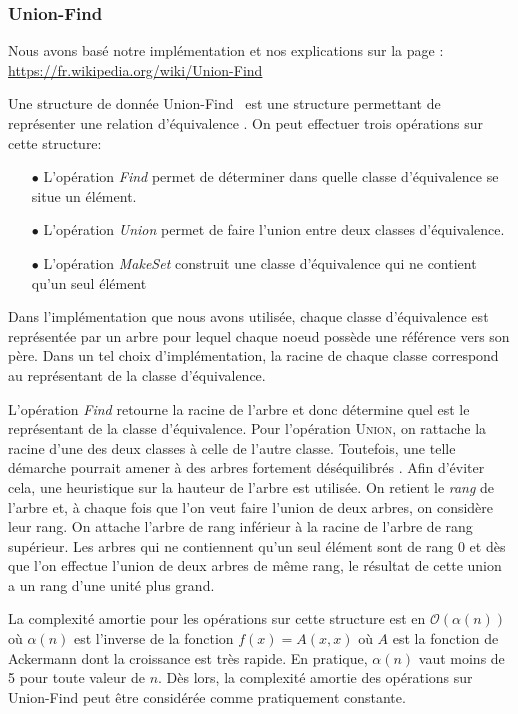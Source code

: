 \subsubsection{Union-Find}
\label{section:unionFind}

Nous avons basé notre implémentation et nos explications sur la page : \url{https://fr.wikipedia.org/wiki/Union-Find}

Une structure de donnée \og Union-Find \fg~est une structure permettant de représenter une relation d'équivalence . On peut effectuer trois opérations sur cette structure:
\begin{itemize}
\item[$\bullet$] L'opération \emph{Find} permet de déterminer dans quelle classe d'équivalence se situe un élément.
\item[$\bullet$] L'opération \emph{Union} permet de faire l'union entre deux classes d'équivalence.
\item[$\bullet$] L'opération \emph{MakeSet} construit une classe d'équivalence qui ne contient qu'un seul élément
\end{itemize}

Dans l'implémentation que nous avons utilisée, chaque classe d'équivalence est représentée par un arbre pour lequel chaque noeud possède une référence vers son père. Dans un tel choix d'implémentation, la racine de chaque classe correspond au représentant de la classe d'équivalence.

L'opération \emph{Find} retourne la racine de l'arbre et donc détermine quel est le représentant de la classe d'équivalence. Pour l'opération \textsc{Union}, on rattache la racine d'une des deux classes à celle de l'autre classe. Toutefois, une telle démarche pourrait amener à des arbres fortement déséquilibrés . Afin d'éviter cela, une heuristique sur la hauteur de l'arbre est utilisée. On retient le \emph{rang} de l'arbre et, à chaque fois que l'on veut faire l'union de deux arbres, on considère leur rang. On attache l'arbre de rang inférieur à la racine de l'arbre de rang supérieur. Les arbres qui ne contiennent qu'un seul élément sont de rang 0 et dès que l'on effectue l'union de deux arbres de même rang, le résultat de cette union a un rang d'une unité plus grand.

La complexité amortie pour les opérations sur cette structure  est en $\mathcal{O}(\alpha (n))$ où $\alpha(n)$ est l'inverse de la fonction $f(x) = A(x,x)$ où $A$ est la fonction de Ackermann dont la croissance est très rapide. En pratique, $\alpha(n)$ vaut moins de 5 pour toute valeur de $n$. Dès lors, la complexité amortie des opérations sur Union-Find peut être considérée comme pratiquement constante.



